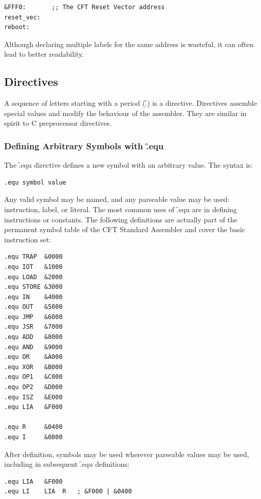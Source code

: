 \begin{lstlisting}[language=cftasm]
&FFF0:       ;; The CFT Reset Vector address
reset_vec:
reboot:
\end{lstlisting}

Although declaring multiple labels for the same address is wasteful, it can
often lead to better readability.

\subsection{Directives}

A sequence of letters starting with a period (\f{.}) is a directive. Directives
assemble special values and modify the behaviour of the assembler. They are
similar in spirit to C preprocessor directives.



\subsubsection{Defining Arbitrary Symbols with \f{.equ}}

The \f{.equ} directive defines a new symbol with an arbitrary value. The syntax is:

\begin{lstlisting}[language=cftasm,numbers=none]
.equ symbol value
\end{lstlisting}

Any valid symbol may be named, and any parseable value may be used:
instruction, label, or literal. The most common uses of \f{.equ} are in
defining instructions or constants. The following definitions are actually part
of the permanent symbol table of the CFT Standard Assembler and cover the basic
instruction set:

\begin{lstlisting}[language=cftasm]
.equ TRAP  &0000
.equ IOT   &1000
.equ LOAD  &2000
.equ STORE &3000
.equ IN    &4000
.equ OUT   &5000
.equ JMP   &6000
.equ JSR   &7000
.equ ADD   &8000
.equ AND   &9000
.equ OR    &A000
.equ XOR   &B000
.equ OP1   &C000
.equ OP2   &D000
.equ ISZ   &E000
.equ LIA   &F000

.equ R     &0400
.equ I     &0800
\end{lstlisting}

After definition, symbols may be used wherever parseable values may be used,
including in subsequent \f{.equ definitions}:

\begin{lstlisting}[language=cftasm]
.equ LIA   &F000
.equ LI    LIA  R   ; &F000 | &0400
\end{lstlisting}

